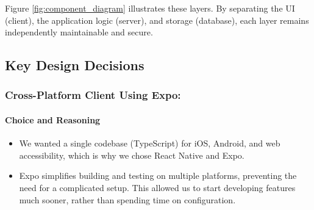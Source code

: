 Figure \ref{fig:component_diagram} illustrates these layers. By separating the UI (client), the application logic (server), and storage (database), each layer remains independently maintainable and secure.

\subsection{Key Design Decisions}

\subsubsection{Cross-Platform Client Using Expo:}

\paragraph{Choice and Reasoning} \begin{itemize} \item We wanted a single codebase (TypeScript) for iOS, Android, and web accessibility, which is why we chose React Native and Expo.
\item Expo simplifies building and testing on multiple platforms, preventing the need for a complicated setup. This allowed us to start developing features much sooner, rather than spending time on configuration.  \end{itemize}

